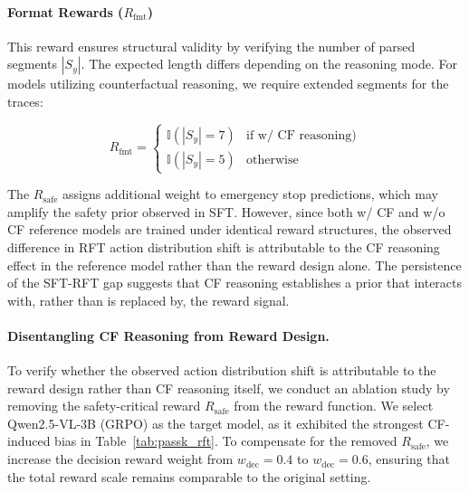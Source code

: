 \documentclass{article}
\begin{document}
\paragraph{Format Rewards ($R_{\text{fmt}}$)} 
This reward ensures structural validity by verifying the number of parsed segments $|S_y|$. The expected length differs depending on the reasoning mode. For models utilizing counterfactual reasoning, we require extended segments for the traces:

\begin{equation}
    R_{\text{fmt}} = 
    \begin{cases} 
    \mathbb{I}(|S_y| = 7) & \text{if w/ CF reasoning)} \\
    \mathbb{I}(|S_y| = 5) & \text{otherwise}
    \end{cases}
\end{equation}

The $R_{\text{safe}}$ assigns additional weight to emergency stop predictions, which may amplify the safety prior observed in SFT. However, since both w/ CF and w/o CF reference models are trained under identical reward structures, the observed difference in RFT action distribution shift is attributable to the CF reasoning effect in the reference model rather than the reward design alone. The persistence of the SFT-RFT gap suggests that CF reasoning establishes a prior that interacts with, rather than is replaced by, the reward signal.

\paragraph{Disentangling CF Reasoning from Reward Design.} To verify whether the observed action distribution shift is attributable to the reward design rather than CF reasoning itself, we conduct an ablation study by removing the safety-critical reward $R_{\text{safe}}$ from the reward function. We select Qwen2.5-VL-3B (GRPO) as the target model, as it exhibited the strongest CF-induced bias in Table~\ref{tab:passk_rft}. To compensate for the removed $R_{\text{safe}}$, we increase the decision reward weight from $w_{\text{dec}}=0.4$ to $w_{\text{dec}}=0.6$, ensuring that the total reward scale remains comparable to the original setting.
\end{document}
